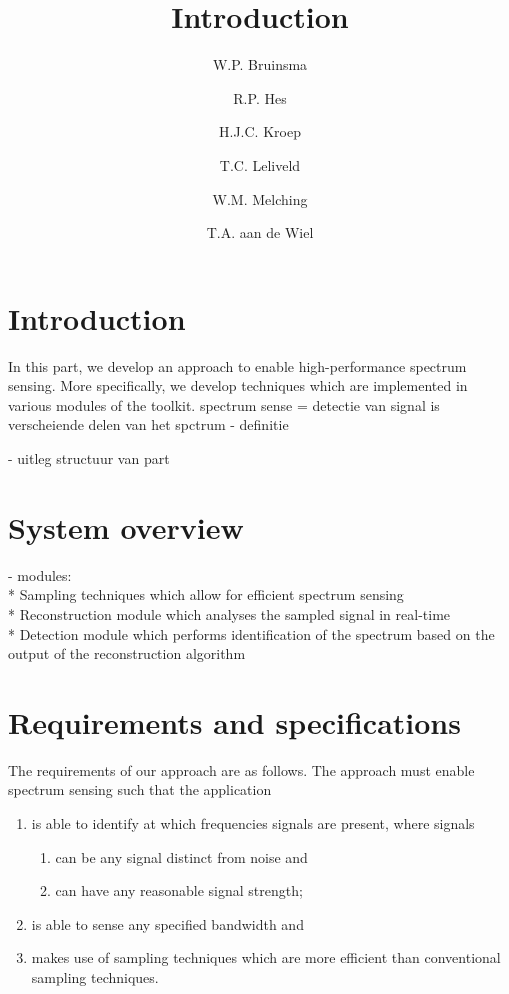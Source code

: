 \documentclass[a4paper, openany, oneside]{memoir}
\title{Introduction}
\author{W.P. Bruinsma \and R.P. Hes \and H.J.C. Kroep \and T.C. Leliveld \and W.M. Melching \and T.A. aan de Wiel}
\begin{document}
\section{Introduction}
In this part, we develop an approach to enable high-performance spectrum sensing. More specifically, we develop techniques which are implemented in various modules of the toolkit.
spectrum sense = detectie van signal is verscheiende delen van het spctrum
- definitie

- uitleg structuur van part


\section{System overview}
- modules: \\
* Sampling techniques which allow for efficient spectrum sensing \\
* Reconstruction module which analyses the sampled signal in real-time \\
* Detection module which performs identification of the spectrum based on the output of the reconstruction algorithm \\


\section{Requirements and specifications}
The requirements of our approach are as follows. The approach must enable spectrum sensing such that the application
\begin{enumerate}
    \item is able to identify at which frequencies signals are present, where signals
    \begin{enumerate}
        \item can be any signal distinct from noise and
        \item can have any reasonable signal strength;
    \end{enumerate}
    \item is able to sense any specified bandwidth and
    \item makes use of sampling techniques which are more efficient than conventional sampling techniques.
\end{enumerate}
\end{document}
